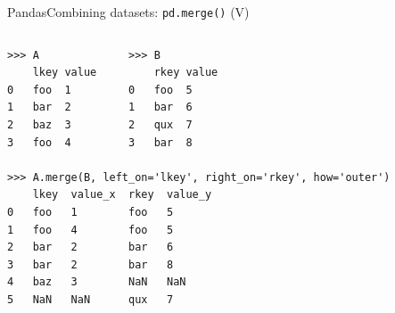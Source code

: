 \documentclass[10pt,compress]{beamer} %
\begin{document}
\begin{frame}[fragile]{Pandas}{Combining datasets: \texttt{pd.merge()} (V)}
	\begin{columns}
    \column{\textwidth}
	\begin{exampleblock}{}
	\vspace{-0.2cm} 
		\begin{lstlisting}
>>> A              >>> B
    lkey value         rkey value
0   foo  1         0   foo  5
1   bar  2         1   bar  6
2   baz  3         2   qux  7
3   foo  4         3   bar  8

>>> A.merge(B, left_on='lkey', right_on='rkey', how='outer')
    lkey  value_x  rkey  value_y
0   foo   1        foo   5
1   foo   4        foo   5
2   bar   2        bar   6
3   bar   2        bar   8
4   baz   3        NaN   NaN
5   NaN   NaN      qux   7
		\end{lstlisting}
		\vspace{-0.2cm} 
	\end{exampleblock}
	\end{columns}
\end{frame}
\end{document}
